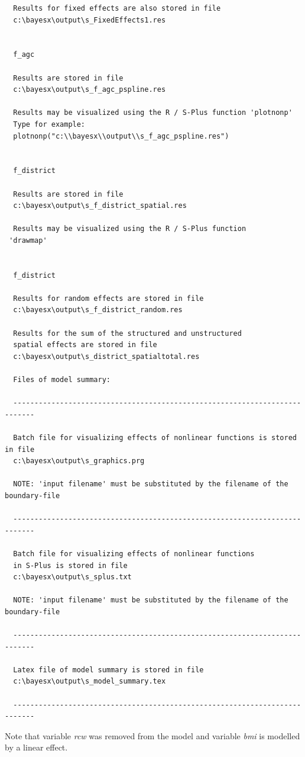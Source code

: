 \begin{verbatim}
  Results for fixed effects are also stored in file
  c:\bayesx\output\s_FixedEffects1.res


  f_agc

  Results are stored in file
  c:\bayesx\output\s_f_agc_pspline.res

  Results may be visualized using the R / S-Plus function 'plotnonp'
  Type for example:
  plotnonp("c:\\bayesx\\output\\s_f_agc_pspline.res")


  f_district

  Results are stored in file
  c:\bayesx\output\s_f_district_spatial.res

  Results may be visualized using the R / S-Plus function
 'drawmap'


  f_district

  Results for random effects are stored in file
  c:\bayesx\output\s_f_district_random.res

  Results for the sum of the structured and unstructured
  spatial effects are stored in file
  c:\bayesx\output\s_district_spatialtotal.res

  Files of model summary:

  ---------------------------------------------------------------------------

  Batch file for visualizing effects of nonlinear functions is stored in file
  c:\bayesx\output\s_graphics.prg

  NOTE: 'input filename' must be substituted by the filename of the boundary-file

  ---------------------------------------------------------------------------

  Batch file for visualizing effects of nonlinear functions
  in S-Plus is stored in file
  c:\bayesx\output\s_splus.txt

  NOTE: 'input filename' must be substituted by the filename of the boundary-file

  ---------------------------------------------------------------------------

  Latex file of model summary is stored in file
  c:\bayesx\output\s_model_summary.tex

  ---------------------------------------------------------------------------
\end{verbatim}
\normalsize

Note that variable {\it rcw} was removed from the model and variable {\it bmi} is modelled by a linear effect.

